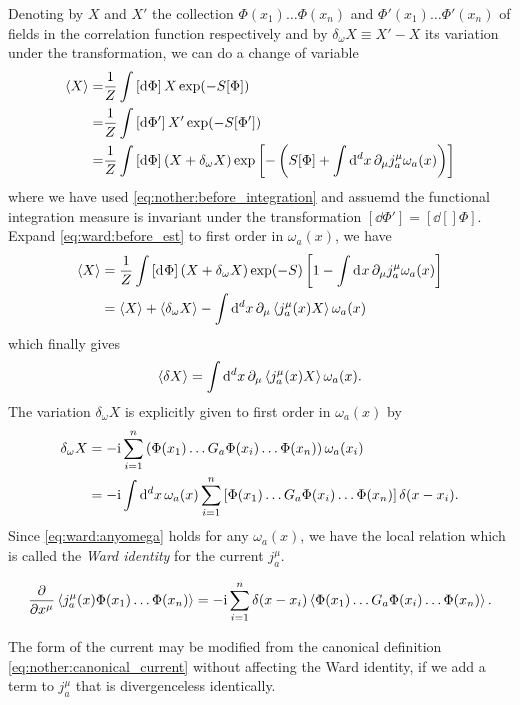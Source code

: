 \documentclass[10pt]{article}
\newcommand{\ii}{\mathrm{i}}
\newenvironment{boxmath}[1]{\begin{tcolorbox}[enhanced,attach boxed title to top center={yshift=-\tcboxedtitleheight/2},boxrule=1pt,title={\centering #1},colframe=NavyBlue!70!black,colback=NavyBlue!10,colbacktitle=NavyBlue!10,fonttitle=\scshape,coltitle=Black]}{\end{tcolorbox}}
\begin{document}
Denoting by $X$ and $X'$ the collection $\Phi(x_1)\dots\Phi(x_n)$ and $\Phi'(x_1)\dots\Phi'(x_n)$ of fields in the correlation function respectively and by $\delta_\omega X\equiv X'-X$ its variation under the transformation, we can do a change of variable
\begin{align}
    \expval{X}=&\frac{1}{Z}\int\left[\dd{\Phi}\right]X\exp(-S[\Phi])\notag\\
            =&\frac{1}{Z}\int\left[\dd{\Phi'}\right]X'\exp(-S[\Phi'])\notag\\
            =&\frac{1}{Z}\int\left[\dd{\Phi}\right]\left(X+\delta_\omega X\right)\exp\left[-\left(S[\Phi]+\int\dd[d]{x}\partial_\mu j^\mu_a\omega_a(x)\right)\right]\label{eq:ward:before_est}
\end{align}
where we have used \cref{eq:nother:before_integration} and assuemd the functional integration measure is invariant under the transformation $\left[\dd{\Phi'}\right]=\left[\dd[]{\Phi}\right]$.
Expand \cref{eq:ward:before_est} to first order in $\omega_a(x)$, we have 
\begin{align}
    \expval{X}&=\frac{1}{Z}\int\left[\dd[]{\Phi}\right]\left(X+\delta_\omega X\right)\exp(-S)\left[1-\int\dd[]{x}\partial_\mu j^\mu_a\omega_a(x)\right]\notag\\
            &=\expval{X}+\expval{\delta_\omega X}-\int\dd[d]{x}\partial_\mu\expval{j^\mu_a(x)X}\omega_a(x)
\end{align}
which finally gives 
\begin{align}
    \expval{\delta X}=\int\dd[d]{x}\partial_\mu\expval{j^\mu_a(x)X}\omega_a(x).\label{eq:ward:anyomega}
\end{align}
The variation $\delta_\omega X$ is explicitly given to first order in $\omega_a(x)$ by 
\begin{align}
    \delta_\omega X&=-\ii\sum_{i=1}^n\left(\Phi(x_1)\dots G_a\Phi(x_i)\dots\Phi(x_n)\right)\omega_a(x_i)\notag\\
                    &=-\ii\int\dd[d]{x}\omega_a(x)\sum_{i=1}^n\left[\Phi(x_1)\dots G_a\Phi(x_i)\dots\Phi(x_n)\right]\delta(x-x_i).
\end{align}
Since \cref{eq:ward:anyomega} holds for any $\omega_a(x)$, we have the local relation which is called the \textit{Ward identity} for the current $j^\mu_a$.
\begin{boxmath}{Ward Identity}
    \begin{align}
        \pdv{x^\mu}\expval{j^\mu_a(x)\Phi(x_1)\dots\Phi(x_n)}=-\ii\sum^n_{i=1}\delta(x-x_i)\expval{\Phi(x_1)\dots G_a\Phi(x_i)\dots\Phi(x_n)}.
    \end{align}
\end{boxmath}
\begin{remark}
    The form of the current may be modified from the canonical definition \cref{eq:nother:canonical_current} without affecting the Ward identity, if we add a term to $j^\mu_a$ that is divergenceless identically.
\end{remark}
\end{document}
